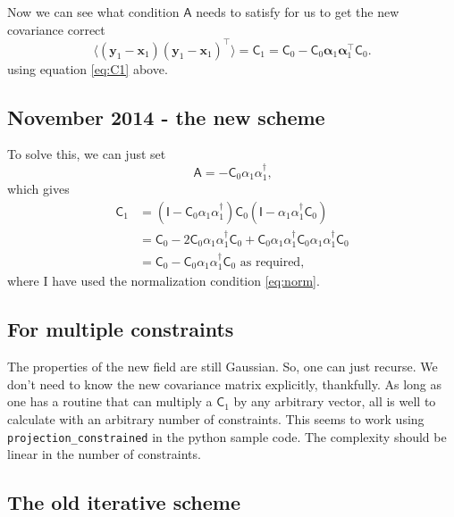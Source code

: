 \documentclass[11pt,a4paper,preprint]{aastex}
\newcommand{\bmath}[1]{\ensuremath{\bm{#1}}}
\renewcommand{\vec}[1]{\bmath{#1}}
\begin{document}
Now we can see what condition $\mathsf{A}$ needs to satisfy for us to
get the new covariance correct
\begin{equation}
\langle (\vec{y}_1-\vec{x}_1) (\vec{y}_1-\vec{x}_1)^{\top} \rangle =
\mathsf{C}_1 =
\mathsf{C}_0 - \mathsf{C}_0 \vec{\alpha}_1 \vec{\alpha}_1^{\top} \mathsf{C}_0
\textrm{.}
\end{equation}
using equation \eqref{eq:C1} above.

\subsection{November 2014 - the new scheme}

To solve this, we can just set
\begin{equation}
\mathsf{A} = - \mathsf{C}_0 \alpha_1 \alpha_1^{\dagger}\textrm{,}\label{eq:A}
\end{equation}
which gives
\begin{align}
\mathsf{C}_1 & = (\mathsf{I} - \mathsf{C}_0 \alpha_1
\alpha_1^{\dagger}) \mathsf{C}_0  (\mathsf{I} - \alpha_1
\alpha_1^{\dagger} \mathsf{C}_0 ) \\
& = \mathsf{C}_0 - 2 \mathsf{C}_0 \alpha_1 \alpha_1^{\dagger}
\mathsf{C}_0 + \mathsf{C}_0 \alpha_1 \alpha_1^{\dagger}
\mathsf{C}_0 \alpha_1 \alpha_1^{\dagger}
\mathsf{C}_0  \\
& = \mathsf{C}_0 - \mathsf{C}_0 \alpha_1 \alpha_1^{\dagger}
\mathsf{C}_0\textrm{ as required,}
\end{align}
where I have used the normalization condition \eqref{eq:norm}.

\subsection{For multiple constraints}

The properties of the new field are still Gaussian. So, one can just
recurse. We don't need to know the new covariance matrix explicitly,
thankfully.  As long as one has a routine that can multiply a
$\mathsf{C}_1$ by any arbitrary vector, all is well to calculate with
an arbitrary number of constraints. This seems to work using
\texttt{projection\_constrained} in the python sample code. The
complexity should be linear in the number of constraints.

\subsection{The old iterative scheme}
\end{document}

